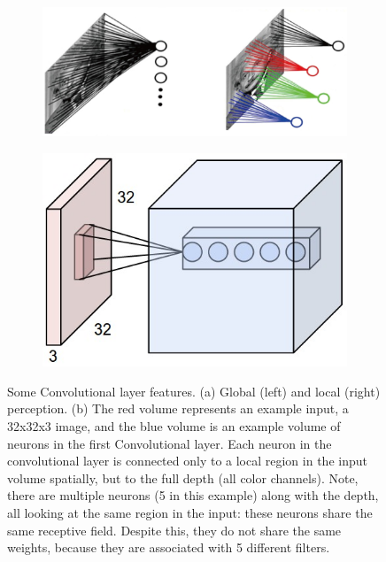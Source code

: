 \begin{figure}[!h]
     \centering
     \begin{subfigure}[b]{0.45\textwidth}
         \centering
         \includegraphics[width=\textwidth]{images/approaches/deep_learning/cnn_local.png}
         \caption{}
         \label{fig:cnn-local}
     \end{subfigure}
     \hfill
     \begin{subfigure}[b]{0.45\textwidth}
         \centering
         \includegraphics[width=\textwidth]{images/approaches/deep_learning/conv_filter_depth.jpeg}
         \caption{}
         \label{fig:cnn-filter-depth}
     \end{subfigure}
        \caption{Some Convolutional layer features. (a) Global (left) and local (right) perception.
        (b) The red volume represents an example input, a 32x32x3 image, and the blue volume is an example volume of neurons in the first Convolutional layer.
        Each neuron in the convolutional layer is connected only to a local region in the input volume spatially, but to the full depth (all color channels).
        Note, there are multiple neurons (5 in this example) along with the depth, all looking at the same region in the input: these neurons share the same receptive field.
        Despite this, they do not share the same weights, because they are associated with 5 different filters.}
        \label{fig:cnn-features-1}
\end{figure}

